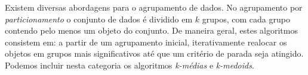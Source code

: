 Existem diversas abordagens para o agrupamento de dados. No agrupamento por
\emph{particionamento} o conjunto de dados é dividido em $k$ grupos, com cada 
grupo contendo pelo menos um objeto do conjunto. De maneira geral, estes
algoritmos consistem em: a partir de um agrupamento inicial, iterativamente 
realocar os objetos em grupos mais significativos até que um critério de parada
seja atingido. Podemos incluir nesta categoria os algoritmos \emph{k-médias} e
\emph{k-medoids}.





